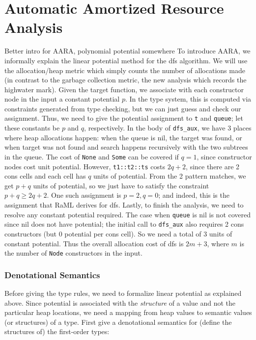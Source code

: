\documentclass{easychair}
\newcounter{rule}
\newcommand{\jan}[1]{{\color{red} #1}}
\theoremstyle{definition}
\begin{document}
\section{Automatic Amortized Resource Analysis}
\label{sect:aara}

\jan{Better intro for AARA, polynomial potential somewhere}
To introduce AARA, we informally explain the linear potential method for the dfs algorithm.
We will use the allocation/heap metric which simply counts the number of allocations made 
(in contrast to the garbage collection metric, the new analysis which records the highwater mark). 
Given the target function, we associate with each constructor node in the input a
constant potential $p$. 
In the type system, this is computed via constraints generated from type checking, but we can 
just guess and check our assignment. 
Thus, we need to give the potential assignment to \texttt{t} and \texttt{queue}; let these
constants be $p$ and $q$, respectively.
In the body of \texttt{dfs\_aux}, we have
3 places where heap allocations happen: when the queue is nil, the target was found, 
or when target was not found and search happens recursively with the two subtrees in the queue.
The cost of \texttt{None} and \texttt{Some} can be covered if $q = 1$, since constructor nodes
cost unit potential. However, \texttt{t1::t2::ts} costs $2q+2$, since there are 2 cons cells and 
each cell has $q$ units of potential. From the 2 pattern matches, we get $p+q$ units of potential,
so we just have to satisfy the constraint $p+q \ge 2q+2$. One such assignment is $p = 2, q = 0$; 
and indeed, this is the assignment that RaML derives for dfs. Lastly, to finish the analysis,
we need to resolve any constant potential required. The case when \texttt{queue} is nil is 
not covered since nil does not have potential; the initial call to \texttt{dfs\_aux} also 
requires 2 cons constructors (but 0 potential per cons cell). So we need a total of 3 units 
of constant potential. Thus the overall allocation cost of dfs is $2m+3$, where $m$ is the number 
of \texttt{Node} constructors in the input.

\subsubsection{Denotational Semantics}

Before giving the type rules, we need to formalize linear potential as explained above.
Since potential is associated with the \emph{structure} of a value and not the particular heap 
locations, we need a mapping from
heap values to semantic values (or structures) of a type. 
First give a denotational semantics for (define the structures of) the first-order types: 
\end{document}

